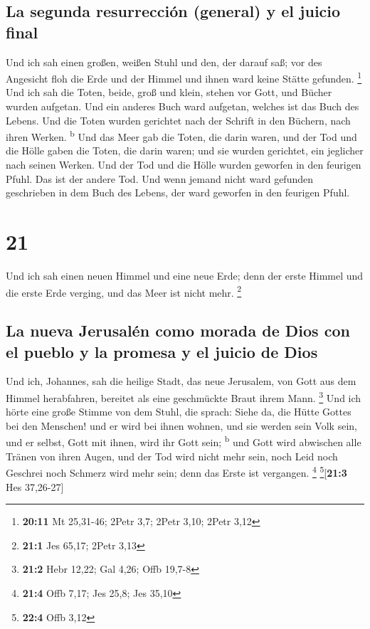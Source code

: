 \hypertarget{la-segunda-resurrecciuxf3n-general-y-el-juicio-final}{%
\subsection{La segunda resurrección (general) y el juicio
final}\label{la-segunda-resurrecciuxf3n-general-y-el-juicio-final}}

 Und ich sah einen großen, weißen Stuhl und den, der
darauf saß; vor des Angesicht floh die Erde und der Himmel und ihnen
ward keine Stätte gefunden. \footnote{\textbf{20:11} Mt 25,31-46; 2Petr
  3,7; 2Petr 3,10; 2Petr 3,12}  Und ich sah die Toten,
beide, groß und klein, stehen vor Gott, und Bücher wurden aufgetan. Und
ein anderes Buch ward aufgetan, welches ist das Buch des Lebens. Und die
Toten wurden gerichtet nach der Schrift in den Büchern, nach ihren
Werken. \textsuperscript{b}  Und das Meer gab die Toten,
die darin waren, und der Tod und die Hölle gaben die Toten, die darin
waren; und sie wurden gerichtet, ein jeglicher nach seinen Werken.
 Und der Tod und die Hölle wurden geworfen in den
feurigen Pfuhl. Das ist der andere Tod.  Und wenn jemand
nicht ward gefunden geschrieben in dem Buch des Lebens, der ward
geworfen in den feurigen Pfuhl.

\hypertarget{section-20}{%
\section{21}\label{section-20}}

 Und ich sah einen neuen Himmel und eine neue Erde; denn
der erste Himmel und die erste Erde verging, und das Meer ist nicht
mehr. \footnote{\textbf{21:1} Jes 65,17; 2Petr 3,13}

\hypertarget{la-nueva-jerusaluxe9n-como-morada-de-dios-con-el-pueblo-y-la-promesa-y-el-juicio-de-dios}{%
\subsection{La nueva Jerusalén como morada de Dios con el pueblo y la
promesa y el juicio de
Dios}\label{la-nueva-jerusaluxe9n-como-morada-de-dios-con-el-pueblo-y-la-promesa-y-el-juicio-de-dios}}

 Und ich, Johannes, sah die heilige Stadt, das neue
Jerusalem, von Gott aus dem Himmel herabfahren, bereitet als eine
geschmückte Braut ihrem Mann. \footnote{\textbf{21:2} Hebr 12,22; Gal
  4,26; Offb 19,7-8}  Und ich hörte eine große Stimme von
dem Stuhl, die sprach: Siehe da, die Hütte Gottes bei den Menschen! und
er wird bei ihnen wohnen, und sie werden sein Volk sein, und er selbst,
Gott mit ihnen, wird ihr Gott sein; \textsuperscript{b} 
und Gott wird abwischen alle Tränen von ihren Augen, und der Tod wird
nicht mehr sein, noch Leid noch Geschrei noch Schmerz wird mehr sein;
denn das Erste ist vergangen. \footnote{\textbf{21:4} Offb 7,17; Jes
  25,8; Jes 35,10} \footnote{\textbf{22:4} Offb 3,12}{[}\textbf{21:3}
Hes 37,26-27{]}

